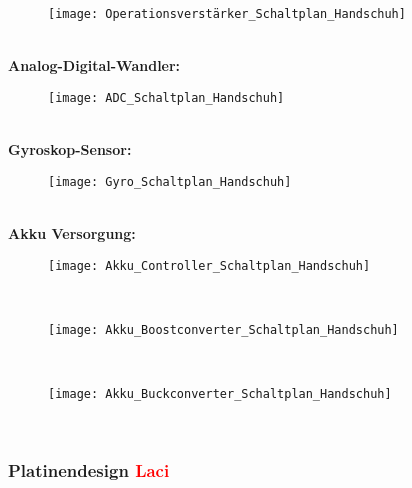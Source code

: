 \documentclass[11pt]{article}
\begin{document}
\begin{figure}[H]
	\begin{center}
		\scalebox{0.5}
		{\texttt{[image: Operationsverstärker\_Schaltplan\_Handschuh]}}
	\end{center}
\end{figure}
\\
\textbf{Analog-Digital-Wandler:}
\\
\begin{figure}[H]
	\begin{center}
		\scalebox{0.5}
		{\texttt{[image: ADC\_Schaltplan\_Handschuh]}}
	\end{center}
\end{figure}
\\
\textbf{Gyroskop-Sensor:}
\\
\begin{figure}[H]
	\begin{center}
		\scalebox{0.5}
		{\texttt{[image: Gyro\_Schaltplan\_Handschuh]}}
	\end{center}
\end{figure}
\\
\textbf{Akku Versorgung:}
\\
\begin{figure}[H]
	\begin{center}
		\scalebox{0.5}
		{\texttt{[image: Akku\_Controller\_Schaltplan\_Handschuh]}}
	\end{center}
\end{figure}
\\
\begin{figure}[H]
	\begin{center}
		\scalebox{0.5}
		{\texttt{[image: Akku\_Boostconverter\_Schaltplan\_Handschuh]}}
	\end{center}
\end{figure}
\\
\begin{figure}[H]
	\begin{center}
		\scalebox{0.5}
		{\texttt{[image: Akku\_Buckconverter\_Schaltplan\_Handschuh]}}
	\end{center}
\end{figure}
\\
\subsubsection{Platinendesign \textcolor{red}{Laci}}
\end{document}
